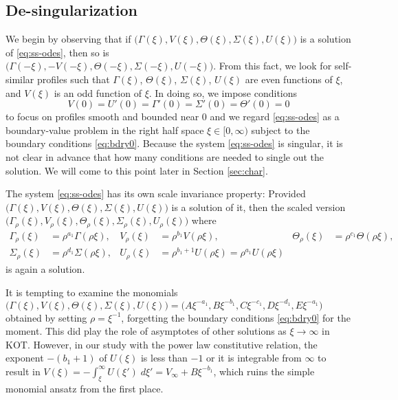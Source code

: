 \documentclass[a4paper,11pt]{article}
\begin{document}
\subsection{De-singularization}
We begin by observing that if $\big(\Gamma(\xi), V(\xi), \Theta(\xi), \Sigma(\xi), U(\xi)\big)$ is a solution of \eqref{eq:ss-odes}, then so is \\$\big(\Gamma(-\xi), -V(-\xi), \Theta(-\xi), \Sigma(-\xi), U(-\xi)\big)$. From this fact, we look for self-similar profiles such that $\Gamma(\xi)$, $\Theta(\xi)$, $\Sigma(\xi)$, $U(\xi)$ are even functions of $\xi$, and $V(\xi)$ is an odd function of $\xi$. In doing so, we impose conditions
\begin{equation}
 V(0)=U'(0)=\Gamma'(0)=\Sigma'(0)=\Theta'(0)=0 \label{eq:bdry0}
\end{equation}
to focus on profiles smooth and bounded near $0$ and we regard \eqref{eq:ss-odes} as a boundary-value problem in the right half space $\xi \in [0,\infty)$ subject to the boundary conditions \eqref{eq:bdry0}. Because the system \eqref{eq:ss-odes} is singular, it is not clear in advance that how many conditions are needed to single out the solution. We will come to this point later in Section \ref{sec:char}.%

The system \eqref{eq:ss-odes} has its own scale invariance property: Provided $\big(\Gamma(\xi), V(\xi), \Theta(\xi), \Sigma(\xi), U(\xi)\big)$ is a solution of it, then the scaled version $\big(\Gamma_\rho(\xi), V_\rho(\xi), \Theta_\rho(\xi), \Sigma_\rho(\xi), U_\rho(\xi)\big)$ where
\begin{align*}
 \Gamma_\rho(\xi)&=\rho^{a_1}\Gamma(\rho\xi), & V_\rho(\xi)&=\rho^{b_1}V(\rho\xi), & \Theta_\rho(\xi)&=\rho^{c_1}\Theta(\rho\xi),\\
 \Sigma_\rho(\xi)&=\rho^{d_1}\Sigma(\rho\xi), & U_\rho(\xi)&=\rho^{b_1+1}U(\rho\xi)=\rho^{a_1}U(\rho\xi)
\end{align*}
is again a solution. 

It is tempting to examine the monomials $\big(\Gamma(\xi), V(\xi), \Theta(\xi), \Sigma(\xi), U(\xi)\big)=\big(A\xi^{-a_1}, B\xi^{-b_1},C\xi^{-c_1},D\xi^{-d_1},E\xi^{-a_1}\big)$ obtained by setting $\rho=\xi^{-1}$, forgetting the boundary conditions \eqref{eq:bdry0} for the moment. This did play the role of asymptotes of other solutions as $\xi \rightarrow \infty$ in KOT. However, in our study with the power law constitutive relation, the exponent $-(b_1+1)$ of $U(\xi)$ is less than $-1$ or it is integrable from $\infty$ to result in $V(\xi) = -\int_\xi^\infty U(\xi') \; d\xi' =V_\infty + B\xi^{-b_1}$, which ruins the simple monomial ansatz from the first place.%
\end{document}
